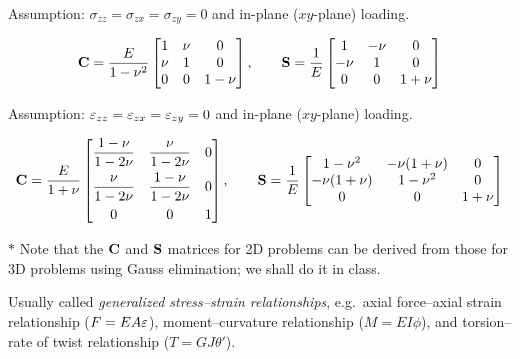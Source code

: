 \begin{description}[style=nextline,leftmargin=1.5em]
  \item[\underline{Case 1: plane stress}]
    Assumption: $\sigma_{zz} = \sigma_{zx} = \sigma_{zy} = 0$ and in-plane ($xy$-plane) loading.
    \begin{fig}
      
    \end{fig}
    \begin{equation}
      \mathbf{C} = \frac{E}{1-\nu^2}\begin{bmatrix}1 & \nu & 0\\ \nu & 1 & 0\\ 0 & 0 & 1-\nu\end{bmatrix}, \qquad
      \mathbf{S} = \frac{1}{E}\begin{bmatrix}1 & -\nu & 0\\ -\nu & 1 & 0\\ 0 & 0 & 1+\nu\end{bmatrix}
    \end{equation}
  \item[\underline{Case 2: plane strain}]
    Assumption: $\varepsilon_{zz} = \varepsilon_{zx} = \varepsilon_{zy} = 0$ and in-plane ($xy$-plane) loading.
    \begin{fig}
      
    \end{fig}
    \begin{equation}
      \mathbf{C} = \frac{E}{1+\nu}
      \begin{bmatrix}
        \dfrac{1-\nu}{1-2\nu} & \dfrac{\nu}{1-2\nu} & 0\\[8pt]
        \dfrac{\nu}{1-2\nu} & \dfrac{1-\nu}{1-2\nu} & 0\\[8pt]
        0 & 0 & 1
      \end{bmatrix}, \qquad
      \mathbf{S} = \frac{1}{E}
      \begin{bmatrix}1-\nu^2 & -\nu(1+\nu) & 0\\ -\nu(1+\nu) & 1-\nu^2 & 0\\ 0 & 0 & 1+\nu\end{bmatrix}
    \end{equation}
\end{description}
\noindent$*$ Note that the $\mathbf{C}$ and $\mathbf{S}$ matrices for 2D problems can be derived from those for 3D problems using Gauss elimination; we shall do it in class.

Usually called \emph{generalized stress--strain relationships}, e.g.\ axial force--axial strain relationship ($F = EA\varepsilon$), moment--curvature relationship ($M = EI\phi$), and torsion--rate of twist relationship ($T = GJ\theta'$).

